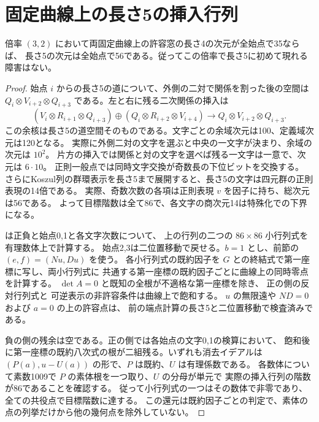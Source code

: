 \section{固定曲線上の長さ5の挿入行列}
\label{sec:fixed-quintic-locus}
\begin{proposition}\label{prop:fixed-quintic-slice}
倍率 $(3,2)$ において両固定曲線上の許容窓の長さ4の次元が全始点で35ならば、
長さ5の次元は全始点で56である。従ってこの倍率で長さ5に初めて現れる障害はない。
\end{proposition}
\begin{proof}
始点 $i$ からの長さ5の道について、外側の二対で関係を割った後の空間は
$Q_i\otimes V_{i+2}\otimes Q_{i+3}$ である。左と右に残る二次関係の挿入は
\[
 (V_i\otimes R_{i+1}\otimes Q_{i+3})\oplus
 (Q_i\otimes R_{i+2}\otimes V_{i+4})
 \longrightarrow Q_i\otimes V_{i+2}\otimes Q_{i+3}.
\]
この余核は長さ5の道空間そのものである。文字ごとの余域次元は100、定義域次元は120となる。
実際に外側二対の文字を選ぶと中央の一文字が決まり、余域の次元は $10^2$。
片方の挿入では関係と対の文字を選べば残る一文字は一意で、次元は $6\cdot10$。
正則一般点では同時文字交換が奇数長の下位ビットを交換する。
さらにKoszul列の群環表示を長さ5まで展開すると、長さ5の文字は四元群の正則表現の14倍である。
実際、奇数次数の各項は正則表現 $v$ を因子に持ち、総次元は56である。
よって目標階数は全て86で、各文字の商次元14は特殊化での下界になる。

 は正負と始点0,1と各文字次数について、
上の行列の二つの $86\times86$ 小行列式を有理数体上で計算する。
始点2,3は二位置移動で戻せる。$b=1$ とし、前節の $(e,f)=(Nu,Du)$ を使う。
各小行列式の既約因子を $G$ との終結式で第一座標に写し、両小行列式に
共通する第一座標の既約因子ごとに曲線上の同時零点を計算する。
$\det A=0$ と既知の全根が不適格な第一座標を除き、
正の側の反対行列式と 可逆表示の非許容条件は曲線上で飽和する。
$u$ の無限遠や $ND=0$ および $a=0$ の上の許容点は、
前の端点計算の長さ5と二位置移動で検査済みである。

負の側の残余は空である。正の側では各始点の文字0,1の検算において、
飽和後に第一座標の既約八次式の根が二組残る。いずれも消去イデアルは
$(P(a),u-U(a))$ の形で、$P$ は既約、$U$ は有理係数である。
各数体について素数1009で $P$ の素体根を一つ取り、$U$ の分母が単元で
実際の挿入行列の階数が86であることを確認する。
従って小行列式の一つはその数体で非零であり、全ての共役点で目標階数に達する。
この還元は既約因子ごとの判定で、素体の点の列挙だけから他の幾何点を除外していない。
\end{proof}
